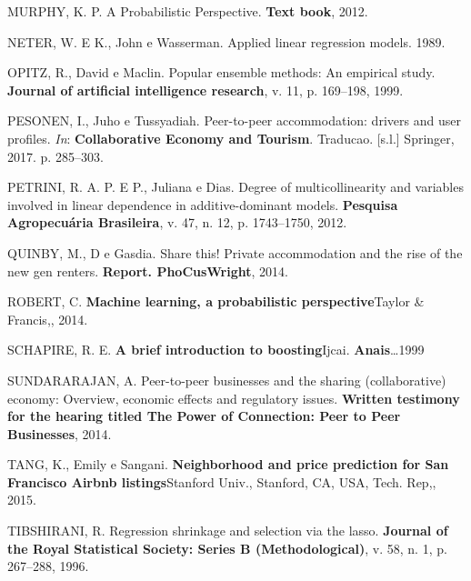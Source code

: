 \documentclass[
	12pt,				%
	a4paper,		%
	oneside,    %
	chapter=TITLE,		   %
	section=TITLE,		   %
	subsection=TITLE,	   %
	subsubsection=TITLE, %
	english,			%
	french,				%
	spanish,			%
	brazil,				%
]{abntex2}
\begin{document}
\leavevmode\hypertarget{ref-murphy2012probabilistic}{}%
MURPHY, K. P. A Probabilistic Perspective. \textbf{Text book}, 2012.

\leavevmode\hypertarget{ref-neter1989applied}{}%
NETER, W. E K., John e Wasserman. Applied linear regression models.
1989.

\leavevmode\hypertarget{ref-opitz1999popular}{}%
OPITZ, R., David e Maclin. Popular ensemble methods: An empirical study.
\textbf{Journal of artificial intelligence research}, v. 11, p.
169--198, 1999.

\leavevmode\hypertarget{ref-pesonen2017peer}{}%
PESONEN, I., Juho e Tussyadiah. Peer-to-peer accommodation: drivers and
user profiles. \emph{In}: \textbf{Collaborative Economy and Tourism}.
Traducao. {[}s.l.{]} Springer, 2017. p. 285--303.

\leavevmode\hypertarget{ref-petrini2012degree}{}%
PETRINI, R. A. P. E P., Juliana e Dias. Degree of multicollinearity and
variables involved in linear dependence in additive-dominant models.
\textbf{Pesquisa Agropecuária Brasileira}, v. 47, n. 12, p. 1743--1750,
2012.

\leavevmode\hypertarget{ref-quinby2014share}{}%
QUINBY, M., D e Gasdia. Share this! Private accommodation and the rise
of the new gen renters. \textbf{Report. PhoCusWright}, 2014.

\leavevmode\hypertarget{ref-robert2014machine}{}%
ROBERT, C. \textbf{Machine learning, a probabilistic perspective}Taylor
\& Francis,, 2014.

\leavevmode\hypertarget{ref-schapire1999brief}{}%
SCHAPIRE, R. E. \textbf{A brief introduction to boosting}Ijcai.
\textbf{Anais}\ldots{}1999

\leavevmode\hypertarget{ref-sundararajan2014peer}{}%
SUNDARARAJAN, A. Peer-to-peer businesses and the sharing (collaborative)
economy: Overview, economic effects and regulatory issues.
\textbf{Written testimony for the hearing titled The Power of
Connection: Peer to Peer Businesses}, 2014.

\leavevmode\hypertarget{ref-tang2015neighborhood}{}%
TANG, K., Emily e Sangani. \textbf{Neighborhood and price prediction for
San Francisco Airbnb listings}Stanford Univ., Stanford, CA, USA, Tech.
Rep,, 2015.

\leavevmode\hypertarget{ref-tibshirani1996regression}{}%
TIBSHIRANI, R. Regression shrinkage and selection via the lasso.
\textbf{Journal of the Royal Statistical Society: Series B
(Methodological)}, v. 58, n. 1, p. 267--288, 1996.
\end{document}
